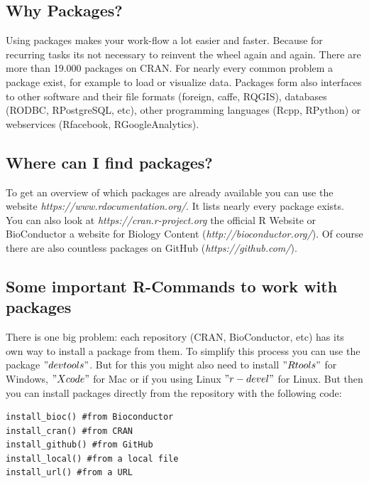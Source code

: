 \documentclass[a4paper,11pt]{article}
\begin{document}
\subsection{Why Packages?}
Using packages makes your work-flow a lot easier and faster. Because for  recurring tasks its not necessary to reinvent the wheel again and again. There are more than 19.000 packages on CRAN. For nearly every common problem a package exist, for example to load or visualize data. Packages form also interfaces to other software and their file formats (foreign, caffe, RQGIS), databases (RODBC, RPostgreSQL, etc), other programming languages (Rcpp, RPython) or webservices (Rfacebook, RGoogleAnalytics).

\subsection{Where can I find packages?}

To get an overview of which packages are already available you can use the website \textit{https://www.rdocumentation.org/}. It lists nearly every package exists. You can also look at \textit{https://cran.r-project.org} the official R Website or  
BioConductor a website for Biology Content (\textit{http://bioconductor.org/}). Of course there are also countless packages on GitHub (\textit{https://github.com/}).

\subsection{Some important R-Commands to work with packages}


%
%
There is one big problem: each repository (CRAN, BioConductor, etc) has its own way to install a package from them. To simplify this process you can use the package $ "devtools" $. But for this you might also need to install $ "Rtools" $ for Windows, $ "Xcode" $ for Mac or if you using Linux $"r-devel"$ for Linux. But then you can install packages directly from the repository with the following code: 


\begin{lstlisting}[frame=single]
install_bioc() #from Bioconductor
install_cran() #from CRAN
install_github() #from GitHub
install_local() #from a local file
install_url() #from a URL
\end{lstlisting}
\end{document}
